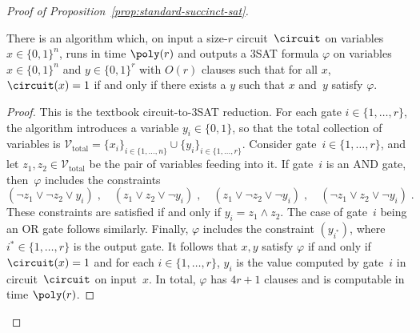 \begin{proof}[Proof of Proposition~\ref{prop:standard-succinct-sat}]
\begin{proposition}\label{prop:circuit-to-sat-reduction}
  There is an algorithm which, on input a size-$r$ circuit~$\circuit$ on
  variables $x \in \{0, 1\}^n$, runs in time $\poly(r)$ and outputs a 3SAT
  formula $\varphi$ on variables $x \in \{0, 1\}^n$ and $y \in \{0, 1\}^r$ with
  $O(r)$ clauses such that for all $x$, $\circuit(x) = 1$ if and only if there
  exists a $y$ such that $x$ and~$y$ satisfy $\varphi$.
\end{proposition}
\begin{proof}
  This is the textbook circuit-to-3SAT reduction.
  For each gate $i \in \{1, \ldots, r\}$, the algorithm introduces a variable
  $y_i \in \{0, 1\}$, so that the total collection of variables is
  $\mathcal{V}_{\mathrm{total}} = \{x_i\}_{i \in \{1, \ldots, n\}} \cup
  \{y_i\}_{i \in \{1, \ldots, r\}}$.
  Consider gate~$i \in \{1, \ldots, r\}$, and let $z_1, z_2 \in
  \mathcal{V}_{\mathrm{total}}$ be the pair of variables feeding into it.
  If gate~$i$ is an AND gate, then~$\varphi$ includes the constraints
  \begin{equation}\label{eq:AND-gate}
    (\neg z_1 \lor \neg z_2 \lor y_i)\;,
    \quad
    (z_1 \lor  z_2 \lor \neg y_i)\;,
    \quad
    (z_1 \lor  \neg z_2 \lor \neg y_i)\;,
    \quad
    (\neg z_1 \lor  z_2 \lor \neg y_i)\;.
  \end{equation}
  These constraints are satisfied if and only if $y_i = z_1 \land z_2$.
  The case of gate~$i$ being an OR gate follows similarly.
  Finally, $\varphi$ includes the constraint $(y_{i^*})$, where $i^* \in \{1,
  \ldots, r\}$ is the output gate.
  It follows that $x, y$ satisfy $\varphi$ if and only if $\circuit(x) = 1$ and
  for each $i \in \{1, \ldots, r\}$, $y_i$ is the value computed by gate~$i$ in
  circuit~$\circuit$ on input~$x$.
  In total, $\varphi$ has $4r+1$ clauses and is computable in time $\poly(r)$.
\end{proof}


\end{proof}
